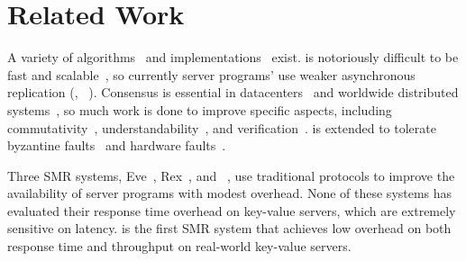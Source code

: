 \section{Related Work} \label{sec:related}


 A variety of
\paxos algorithms~\cite{paxos:practical,paxos,paxos:simple,paxos:complex,
epaxos:sosp13} and 
implementations~\cite{paxos:live,paxos:practical,chubby:osdi,crane:sosp15} 
exist. 
\paxos is notoriously difficult to be fast and 
scalable~\cite{ellis:thesis,manos:hotdep10,scatter:sosp11}, so currently server 
programs' use weaker asynchronous replication (\eg, \redis~\cite{redis}). 
Consensus is essential in
datacenters~\cite{matei:hotcloud11, mesos:nsdi11, datacenter:os} and worldwide 
distributed systems~\cite{spanner:osdi12,mencius:osdi08}, so much work 
is done to improve specific aspects, 
including commutativity~\cite{epaxos:sosp13,marandi:icdcs14}, 
understandability~\cite{raft:usenix14,paxos}, and 
verification~\cite{modist:nsdi09,demeter:sosp11}. \paxos is extended to 
tolerate 
byzantine faults~\cite{brun:icdcs12,meling:icdcs12,bal:icdcs12,pbft:osdi99,
zyzzyva:sosp07,martins2013experiences,araujo2012replication,amir2010steward} and 
hardware faults~\cite{hardpaxos:srds14}.







Three SMR systems, Eve~\cite{eve:osdi12}, 
Rex~\cite{rex:eurosys14}, and \crane~\cite{crane:sosp15}, use traditional 
\paxos protocols to improve the availability of server programs with modest 
overhead. None of these systems has evaluated their response time overhead on 
key-value servers, which are extremely sensitive on latency. \xxx is the first 
SMR system that achieves low overhead on both response time and throughput on 
real-world key-value servers.

